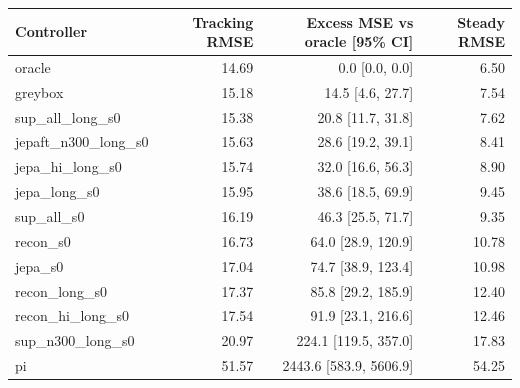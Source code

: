 \begin{tabular}{lrrr}
\toprule
Controller & Tracking RMSE & Excess MSE vs oracle [95\% CI] & Steady RMSE\\
\midrule
oracle & 14.69 & 0.0 [0.0, 0.0] & 6.50\\
greybox & 15.18 & 14.5 [4.6, 27.7] & 7.54\\
sup\_all\_long\_s0 & 15.38 & 20.8 [11.7, 31.8] & 7.62\\
jepaft\_n300\_long\_s0 & 15.63 & 28.6 [19.2, 39.1] & 8.41\\
jepa\_hi\_long\_s0 & 15.74 & 32.0 [16.6, 56.3] & 8.90\\
jepa\_long\_s0 & 15.95 & 38.6 [18.5, 69.9] & 9.45\\
sup\_all\_s0 & 16.19 & 46.3 [25.5, 71.7] & 9.35\\
recon\_s0 & 16.73 & 64.0 [28.9, 120.9] & 10.78\\
jepa\_s0 & 17.04 & 74.7 [38.9, 123.4] & 10.98\\
recon\_long\_s0 & 17.37 & 85.8 [29.2, 185.9] & 12.40\\
recon\_hi\_long\_s0 & 17.54 & 91.9 [23.1, 216.6] & 12.46\\
sup\_n300\_long\_s0 & 20.97 & 224.1 [119.5, 357.0] & 17.83\\
pi & 51.57 & 2443.6 [583.9, 5606.9] & 54.25\\
\bottomrule
\end{tabular}